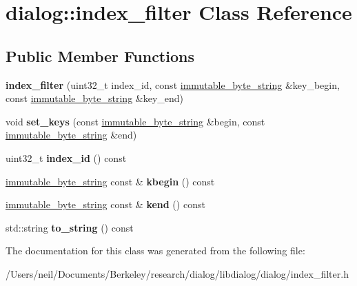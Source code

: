 \hypertarget{classdialog_1_1index__filter}{}\section{dialog\+:\+:index\+\_\+filter Class Reference}
\label{classdialog_1_1index__filter}
\subsection*{Public Member Functions}
\begin{DoxyCompactItemize}
\item 
\mbox{\label{classdialog_1_1index__filter_a927a410993b0d119be468ef5448b6bbc}} 
{\bfseries index\+\_\+filter} (uint32\+\_\+t index\+\_\+id, const \hyperlink{classdialog_1_1immutable__byte__string}{immutable\+\_\+byte\+\_\+string} \&key\+\_\+begin, const \hyperlink{classdialog_1_1immutable__byte__string}{immutable\+\_\+byte\+\_\+string} \&key\+\_\+end)
\item 
\mbox{\label{classdialog_1_1index__filter_ac75cb858dfbb65d8b60f06e92a984b8e}} 
void {\bfseries set\+\_\+keys} (const \hyperlink{classdialog_1_1immutable__byte__string}{immutable\+\_\+byte\+\_\+string} \&begin, const \hyperlink{classdialog_1_1immutable__byte__string}{immutable\+\_\+byte\+\_\+string} \&end)
\item 
\mbox{\label{classdialog_1_1index__filter_a28f90c8f53e889211525abb86326341f}} 
uint32\+\_\+t {\bfseries index\+\_\+id} () const
\item 
\mbox{\label{classdialog_1_1index__filter_addfbf3116860f23652e9a2d9f0fef3f6}} 
\hyperlink{classdialog_1_1immutable__byte__string}{immutable\+\_\+byte\+\_\+string} const  \& {\bfseries kbegin} () const
\item 
\mbox{\label{classdialog_1_1index__filter_a4a8bb0748fedf3db6e8e06dec29f10fe}} 
\hyperlink{classdialog_1_1immutable__byte__string}{immutable\+\_\+byte\+\_\+string} const  \& {\bfseries kend} () const
\item 
\mbox{\label{classdialog_1_1index__filter_aee8e4e93802988de1af66e184197c5a3}} 
std\+::string {\bfseries to\+\_\+string} () const
\end{DoxyCompactItemize}


The documentation for this class was generated from the following file\+:\begin{DoxyCompactItemize}
\item 
/\+Users/neil/\+Documents/\+Berkeley/research/dialog/libdialog/dialog/index\+\_\+filter.\+h\end{DoxyCompactItemize}
